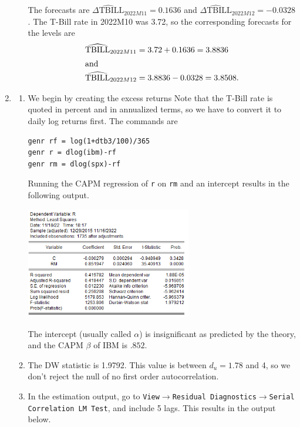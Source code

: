 \documentclass[11pt, a4paper]{article}
\begin{document}
\begin{enumerate}
\begin{enumerate}
\begin{center}
\end{center}
The forecasts are $\widehat{\Delta\mbox{TBILL}}_{2022M11}=0.1636$ and $\widehat{\Delta\mbox{TBILL}}_{2022M12}=-0.0328$. The T-Bill rate in 2022M10 was 3.72, so the corresponding forecasts for the levels are
\begin{align*}
\widehat{\mbox{TBILL}}_{2022M11}&=3.72+0.1636=3.8836\\
\intertext{and}
 \widehat{\mbox{TBILL}}_{2022M12}&=3.8836-0.0328=3.8508.
\end{align*}
\end{enumerate}
\item
\begin{enumerate}
\item We begin by creating the excess returns Note that the T-Bill rate is quoted in percent and in annualized terms, so we have to convert it to daily log returns first. The commands are
\begin{verbatim}
genr rf = log(1+dtb3/100)/365
genr r = dlog(ibm)-rf
genr rm = dlog(spx)-rf
\end{verbatim}
Running the CAPM regression of \texttt{r} on \texttt{rm} and an intercept results in the following output.
\begin{center}
\includegraphics[width=0.6\textwidth]{capm}
\end{center}
The intercept (usually called $\alpha$) is insignificant as predicted by the theory, and the CAPM $\beta$ of IBM is $.852$.
\item The DW statistic is 1.9792. This value is between $d_u=1.78$ and 4, so we don't reject the null of no first order autocorrelation.
\item In the estimation output, go to \texttt{View$\rightarrow$Residual Diagnostics$\rightarrow$\linebreak Serial Correlation LM Test}, and include 5 lags. This results in the output below.
\begin{center}

\end{center}
\end{enumerate}
\end{enumerate}
\end{document}
